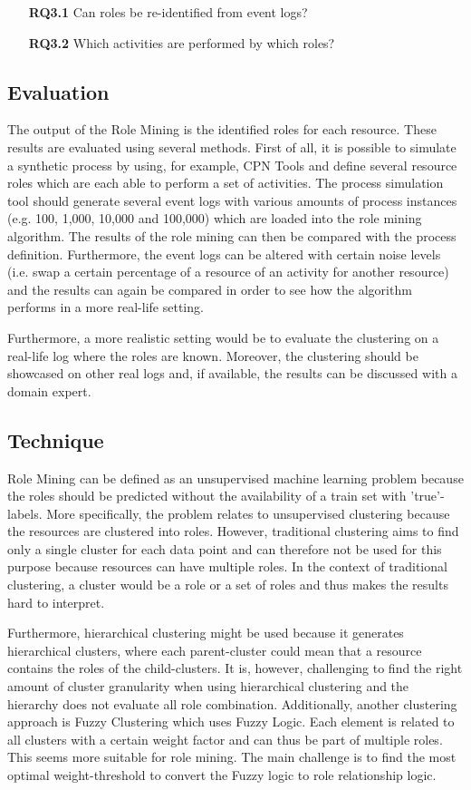 \begin{enumerate}
	\item[\textbf{RQ3.1}] Can roles be re-identified from event logs?
    \item[\textbf{RQ3.2}] Which activities are performed by which roles?
\end{enumerate}

\subsection{Evaluation}\label{section:role_mining_evaluation}
The output of the Role Mining is the identified roles for each resource. These results are evaluated using several methods. First of all, it is possible to simulate a synthetic process by using, for example, CPN Tools and define several resource roles which are each able to perform a set of activities. The process simulation tool should generate several event logs with various amounts of process instances (e.g. 100, 1,000, 10,000 and 100,000) which are loaded into the role mining algorithm. The results of the role mining can then be compared with the process definition. Furthermore, the event logs can be altered with certain noise levels (i.e. swap a certain percentage of a resource of an activity for another resource) and the results can again be compared in order to see how the algorithm performs in a more real-life setting. 

Furthermore, a more realistic setting would be to evaluate the clustering on a real-life log where the roles are known. Moreover, the clustering should be showcased on other real logs and, if available, the results can be discussed with a domain expert. 

\subsection{Technique}
Role Mining can be defined as an unsupervised machine learning problem because the roles should be predicted without the availability of a train set with 'true'-labels. More specifically, the problem relates to unsupervised clustering because the resources are clustered into roles. However, traditional clustering aims to find only a single cluster for each data point and can therefore not be used for this purpose because resources can have multiple roles. In the context of traditional clustering, a cluster would be a role or a set of roles and thus makes the results hard to interpret.

Furthermore, hierarchical clustering might be used because it generates hierarchical clusters, where each parent-cluster could mean that a resource contains the roles of the child-clusters. It is, however, challenging to find the right amount of cluster granularity when using hierarchical clustering and the hierarchy does not evaluate all role combination. Additionally, another clustering approach is Fuzzy Clustering which uses Fuzzy Logic. Each element is related to all clusters with a certain weight factor and can thus be part of multiple roles. This seems more suitable for role mining. The main challenge is to find the most optimal weight-threshold to convert the Fuzzy logic to role relationship logic. 

